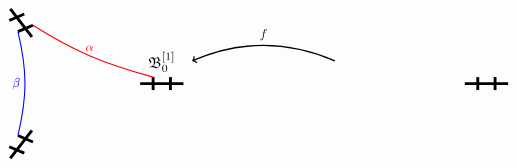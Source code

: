 \documentclass{amsart}
\newcommand{\bush}{{\mathfrak B }}
\newcommand{\1}{{\mathbb 1 }}
\begin{document}
\begin{figure}[t!]
\[\begin{tikzpicture}[xscale=2,yscale=1.5]







\begin{scope}[rotate =0,shift={(1.3,0)},scale=0.6]
\draw[line width=0.8mm] (-0.5,0)--(0.5,0); 
\draw[line width=0.8mm] (-0.2,-0.2)--(-0.2,0.2);
\draw[line width=0.8mm] (0.2,-0.2)--(0.2,0.2);

\coordinate (la1) at (-0.2,0.2);
\coordinate (la0) at (-0.2,-0.2);


\draw[line width=0.4mm] (4,0.7) edge[->,bend right]node[above]{$f$} (0.7,0.7);


\node[above,scale=1.2] at(0,0.2){$\bush^{[1]}_0$};

 \end{scope}
  
  \begin{scope}[rotate =120,shift={(1.3,0)}, scale=0.6]
\draw[line width=0.8mm] (-0.5,0)--(0.5,0); 
\draw[line width=0.8mm] (-0.2,-0.2)--(-0.2,0.2);
\draw[line width=0.8mm] (0.2,-0.2)--(0.2,0.2);

\coordinate (lb1) at (-0.2,0.2);
\coordinate (lb0) at (-0.2,-0.2);
  \end{scope}
  
   
 
   
  \begin{scope}[rotate =240,shift={(1.3,0)}, scale=0.6]
\draw[line width=0.8mm] (-0.5,0)--(0.5,0); 
\draw[line width=0.8mm] (-0.2,-0.2)--(-0.2,0.2);
\draw[line width=0.8mm] (0.2,-0.2)--(0.2,0.2);

\coordinate (lc1) at (-0.2,0.2);
\coordinate (lc0) at (-0.2,-0.2);
  \end{scope}


 \draw[line width=0.3mm, red] (la1) edge[bend left=10] node[above] {$\alpha$} (lb0);

 \draw[line width=0.3mm, blue] (lc0) edge[bend right=10] node[left] {$\beta$}  (lb1);




\begin{scope}[shift={(4.5,0)}]



\begin{scope}[rotate =0,shift={(1.3,0)},scale=-0.6]
\draw[line width=0.8mm] (-0.5,0)--(0.5,0); 
\draw[line width=0.8mm] (-0.2,-0.2)--(-0.2,0.2);
\draw[line width=0.8mm] (0.2,-0.2)--(0.2,0.2);


\end{scope}
\end{scope}
\end{tikzpicture}\]
\end{figure}
\end{document}
